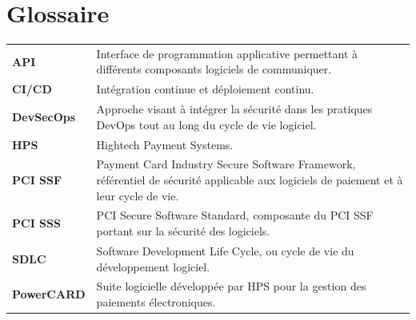 \chapter*{Glossaire}

\begin{longtable}{>{\bfseries}p{3cm}p{11cm}}
API & Interface de programmation applicative permettant à différents composants logiciels de communiquer. \\
CI/CD & Intégration continue et déploiement continu. \\
DevSecOps & Approche visant à intégrer la sécurité dans les pratiques DevOps tout au long du cycle de vie logiciel. \\
HPS & Hightech Payment Systems. \\
PCI SSF & Payment Card Industry Secure Software Framework, référentiel de sécurité applicable aux logiciels de paiement et à leur cycle de vie. \\
PCI SSS & PCI Secure Software Standard, composante du PCI SSF portant sur la sécurité des logiciels. \\
SDLC & Software Development Life Cycle, ou cycle de vie du développement logiciel. \\
PowerCARD & Suite logicielle développée par HPS pour la gestion des paiements électroniques. \\
\end{longtable}

\clearpage
